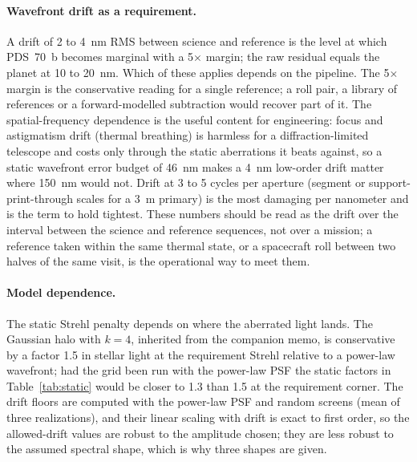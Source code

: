 \documentclass[11pt]{article}
\begin{document}
\paragraph{Wavefront drift as a requirement.} A drift of 2 to 4~nm RMS between science and reference is the level at which PDS~70~b becomes marginal with a 5$\times$ margin; the raw residual equals the planet at 10 to 20~nm. Which of these applies depends on the pipeline. The 5$\times$ margin is the conservative reading for a single reference; a roll pair, a library of references or a forward-modelled subtraction would recover part of it. The spatial-frequency dependence is the useful content for engineering: focus and astigmatism drift (thermal breathing) is harmless for a diffraction-limited telescope and costs only through the static aberrations it beats against, so a static wavefront error budget of 46~nm makes a 4~nm low-order drift matter where 150~nm would not. Drift at 3 to 5 cycles per aperture (segment or support-print-through scales for a 3~m primary) is the most damaging per nanometer and is the term to hold tightest. These numbers should be read as the drift over the interval between the science and reference sequences, not over a mission; a reference taken within the same thermal state, or a spacecraft roll between two halves of the same visit, is the operational way to meet them.

\paragraph{Model dependence.} The static Strehl penalty depends on where the aberrated light lands. The Gaussian halo with $k = 4$, inherited from the companion memo, is conservative by a factor 1.5 in stellar light at the requirement Strehl relative to a power-law wavefront; had the grid been run with the power-law PSF the static factors in Table~\ref{tab:static} would be closer to 1.3 than 1.5 at the requirement corner. The drift floors are computed with the power-law PSF and random screens (mean of three realizations), and their linear scaling with drift is exact to first order, so the allowed-drift values are robust to the amplitude chosen; they are less robust to the assumed spectral shape, which is why three shapes are given.
\end{document}
